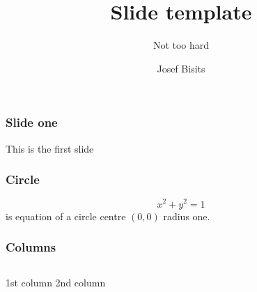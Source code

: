 \documentclass[aspectratio=169]{beamer}
\title{Slide template}
\subtitle{Not too hard}
\author[Bisits, Josef]{Josef Bisits}
\institute[School of Mathematics and Statistics, UNSW]{School of Mathematics and Statistics}
\newlength{\colwidth}
\begin{document}
\begin{frame}
    \titlepage
\end{frame}

\begin{frame}
\frametitle{Slide one}
    This is the first slide
\end{frame}

\begin{frame}
\frametitle{Circle}
    \begin{equation}
        x^2 + y^2 = 1
    \end{equation}
    \pause
    is equation of a circle centre $(0,0)$ radius one.
\end{frame}

\begin{frame}
\frametitle{Columns}
\begin{columns}
    \column{\colwidth}
        1st column
    \column{\colwidth}
        2nd column
\end{columns}
\end{frame}
\end{document}
